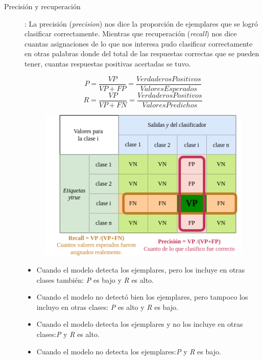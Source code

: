 \begin{description}

 \item [Precisión y recuperación]: 
 La precisión (\emph{precision}) nos dice la proporción de ejemplares que se logró clasificar correctamente. 
 Mientras que recuperación (\emph{recall}) nos dice cuantas asignaciones de lo que nos interesa pudo clasificar correctamente en otras palabras donde del total de las respuestas correctas que se pueden tener, cuantas respuestas positivas acertadas se tuvo.
 
 
    \begin{equation}
        P = \dfrac{VP}{VP + FP}  = \dfrac{Verdaderos Positivos}{Valores Esperados}
    \end{equation}
    \begin{equation}
        R = \dfrac{VP}{VP + FN} = \dfrac{Verdaderos Positivos}{Valores Predichos}
    \end{equation}

    \begin{figure}[H]
        \centering
        \includegraphics[scale=0.7]{../Figuras/Medidas_pr.png}
     \label{fig:mcPR} 
    \end{figure}

    
    \begin{itemize}
     \item Cuando el modelo detecta los ejemplares, pero los incluye en otras clases también: \emph{P} es bajo y \emph{R} es alto. 
     \item Cuando el modelo no detectó bien los ejemplares, pero tampoco los incluyo en otras clases: \emph{P} es alto y \emph{R} es bajo. 
     \item Cuando el modelo detecta los ejemplares y no los incluye en otras clases:\emph{P} y \emph{R} es alto. 
     \item Cuando el modelo no detecta los ejemplares:\emph{P} y \emph{R} es bajo. 
     \end{itemize}



\end{description}
